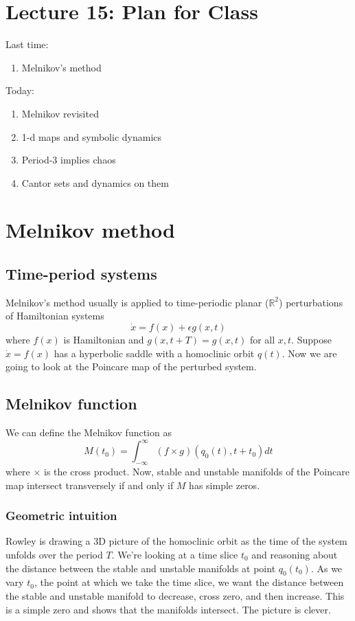 \documentclass{article}
\begin{document}
\section{Lecture 15: Plan for Class}
Last time:
\begin{enumerate}
    \item Melnikov's method
\end{enumerate}

Today:
\begin{enumerate}
    \item Melnikov revisited
    \item 1-d maps and symbolic dynamics
    \item Period-3 implies chaos
    \item Cantor sets and dynamics on them
\end{enumerate}

\section{Melnikov method}

\subsection{Time-period systems}
Melnikov's method usually is applied to time-periodic planar ($\mathbb{R}^2$) perturbations of Hamiltonian systems
\[
\dot{x} = f(x) + \epsilon g(x,t)
\]
where $f(x)$ is Hamiltonian and $g(x,t+T)=g(x,t)$ for all $x,t$. Suppose $\dot{x}=f(x)$ has a hyperbolic saddle with a homoclinic orbit $q(t)$. Now we are going to look at the Poincare map of the perturbed system.

\subsection{Melnikov function}

We can define the Melnikov function as 
\[
M(t_0) = \int_{-\infty}^{\infty}\left(f\times g\right)\left(q_0(t),t+t_0\right)dt
\]
where $\times$ is the cross product. Now, stable and unstable manifolds of the Poincare map intersect transversely if and only if $M$ has simple zeros.

\subsubsection{Geometric intuition}

Rowley is drawing a 3D picture of the homoclinic orbit as the time of the system unfolds over the period $T$. We're looking at a time slice $t_0$ and reasoning about the distance between the stable and unstable manifolds at point $q_0(t_0)$. As we vary $t_0$, the point at which we take the time slice, we want the distance between the stable and unstable manifold to decrease, cross zero, and then increase. This is a simple zero and shows that the manifolds intersect. The picture is clever.
\end{document}

